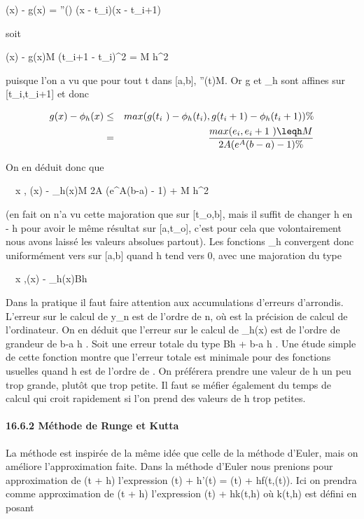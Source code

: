 \documentclass[]{article}
\begin{document}
\phi(x) - g(x) = \phi''(\xi) (x - t_i)(x - t_i+1)

soit

\phi(x) - g(x)\leq M (t_i+1 -
t_i)^2  = M h^2

puisque l'on a vu que pour tout t dans [a,b],
\phi''(t)\leq M. Or g et \phi_h sont affines sur
[t_i,t_i+1] et donc

\begin{align*} g(x) -
\phi_h(x)& \leq&
max(g(t_i~) -
\phi_h(t_i),g(t_i+1) -
\phi_h(t_i+1))\%&
\\ & =&
max(e_i,e_i+1~)
\leqh M \over 2A
(e^A(b-a) - 1) \%& \\
\end{align*}

On en déduit donc que

\forall~~x \in [a,b], \phi(x) -
\phi_h(x)\leqh M \over
2A (e^A(b-a) - 1) + M h^2 

(en fait on n'a vu cette majoration que sur [t_o,b], mais
il suffit de changer h en - h pour avoir le même résultat sur
[a,t_o], c'est pour cela que volontairement nous avons
laissé les valeurs absolues partout). Les fonctions \phi_h
convergent donc uniformément vers \phi sur [a,b] quand h tend vers 0,
avec une majoration du type

\forall~~x \in [a,b],\phi(x) -
\phi_h(x)\leq Bh

Dans la pratique il faut faire attention aux accumulations d'erreurs
d'arrondis. L'erreur sur le calcul de y_n est de l'ordre de n\epsilon,
où \epsilon est la précision de calcul de l'ordinateur. On en déduit que
l'erreur sur le calcul de \phi_h(x) est de l'ordre de grandeur de
 b-a \over h \epsilon. Soit une erreur totale du type Bh +
b-a \over h \epsilon. Une étude simple de cette fonction
montre que l'erreur totale est minimale pour des fonctions usuelles
quand h est de l'ordre de \sqrt\epsilon. On préférera
prendre une valeur de h un peu trop grande, plutôt que trop petite. Il
faut se méfier également du temps de calcul qui croit rapidement si l'on
prend des valeurs de h trop petites.

\paragraph{16.6.2 Méthode de Runge et Kutta}

La méthode est inspirée de la même idée que celle de la méthode d'Euler,
mais on améliore l'approximation faite. Dans la méthode d'Euler nous
prenions pour approximation de \phi(t + h) l'expression \phi(t) + h\phi'(t) =
\phi(t) + hf(t,\phi(t)). Ici on prendra comme approximation de \phi(t + h)
l'expression \phi(t) + hk(t,h) où k(t,h) est défini en posant
\end{document}
